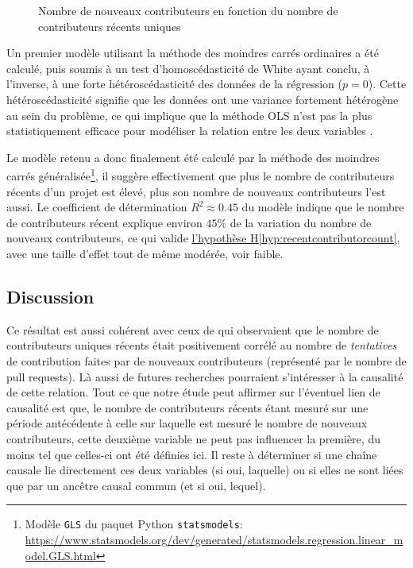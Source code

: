 \begin{figure}
    

    

    \caption{Nombre de nouveaux contributeurs en fonction du nombre de contributeurs récents uniques}
    \label{fig:contributorCount}
\end{figure}

Un premier modèle utilisant la méthode des moindres carrés ordinaires a été calculé, puis soumis à un test
d'homoscédasticité de White ayant conclu, à l'inverse, à une forte hétéroscédasticité des données de la
régression ($p = 0$). Cette hétéroscédasticité signifie que les données ont une variance fortement hétérogène
au sein du problème, ce qui implique que la méthode OLS n'est pas la plus statistiquement efficace pour
modéliser la relation entre les deux variables \parencite{GLS-2021}.

Le modèle retenu a donc finalement été calculé par la méthode des moindres carrés généralisée\footnote{Modèle
\texttt{GLS} du paquet Python \texttt{statsmodels}:
\url{https://www.statsmodels.org/dev/generated/statsmodels.regression.linear_model.GLS.html}}, il suggère
effectivement que plus le nombre de contributeurs récents d'un projet est élevé, plus son nombre de nouveaux
contributeurs l'est aussi. Le coefficient de détermination $R^2 \approx 0.45$ du modèle indique que le nombre
de contributeurs récent explique environ $45\%$ de la variation du nombre de nouveaux contributeurs, ce qui
valide \hyperref[hyp:recentcontributorcount]{l'hypothèse H\ref*{hyp:recentcontributorcount}}, avec une taille
d'effet tout de même modérée, voir faible.

\subsection{Discussion}

Ce résultat est aussi cohérent avec ceux de \textcite[p.~12-13,16]{signals-2019} qui observaient que le nombre
de contributeurs uniques récents était positivement corrélé au nombre de \emph{tentatives} de contribution
faites par de nouveaux contributeurs (représenté par le nombre de \glspl{pull request}). Là aussi de futures
recherches pourraient s'intéresser à la causalité de cette relation. Tout ce que notre étude peut affirmer sur
l'éventuel lien de causalité est que, le nombre de contributeurs récents étant mesuré sur une période
antécédente à celle sur laquelle est mesuré le nombre de nouveaux contributeurs, cette deuxième variable ne
peut pas influencer la première, du moins tel que celles-ci ont été définies ici. Il reste à déterminer si une
chaîne causale lie directement ces deux variables (si oui, laquelle) ou si elles ne sont liées que par un
ancêtre causal commun (et si oui, lequel).

